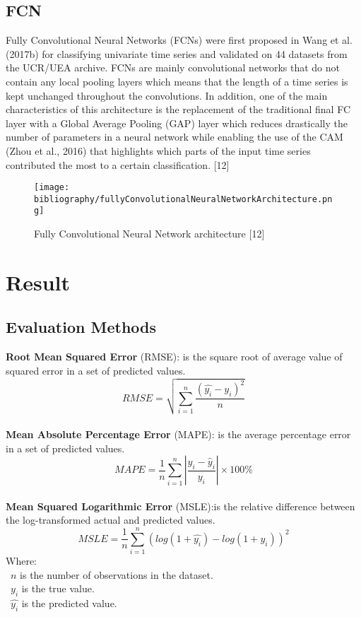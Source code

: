\documentclass{ieeeojies}
\begin{document}
\subsection{FCN}
Fully Convolutional Neural Networks (FCNs) were first proposed in Wang et al. (2017b) for classifying univariate time series and validated on 44 datasets from the UCR/UEA archive. FCNs are mainly convolutional networks that do not contain any local pooling layers which means that the length of a time series is kept unchanged throughout the convolutions. In addition, one of the main characteristics of this architecture is the replacement of the traditional final FC layer with a Global Average Pooling (GAP) layer which reduces drastically the number of parameters in a neural network while enabling the use of the CAM (Zhou et al., 2016) that highlights which parts of the input time series contributed the most to a certain classification.  [12]
\begin{figure}[H]
    \centering
    \begin{minipage}{1\linewidth}
        \centering
        \texttt{[image: bibliography/fullyConvolutionalNeuralNetworkArchitecture.png]}
        \caption{Fully Convolutional Neural Network architecture [12]}
        \label{fig11}
    \end{minipage}
\end{figure}

\section{Result}
\subsection{Evaluation Methods}
\textbf{Root Mean Squared Error} (RMSE): is the square root of average value of squared error in a set of predicted values.\\
\[RMSE=\sqrt{\sum_{i=1}^{n} \frac{(\hat{y_i}-y_i )^2}{n} }\]\\
\textbf{Mean Absolute Percentage Error} (MAPE): is the average percentage error in a set of predicted values.\\
\[MAPE = \frac{1}{n} \sum_{i=1}^{n} \left| \frac{y_i - \hat{y}_i}{y_i} \right| \times 100\%\]\\
\textbf{Mean Squared Logarithmic Error} (MSLE):is the relative difference between the log-transformed actual and predicted values.\\
\[MSLE=\frac{1}{n}\sum_{i=1}^{n}(log(1+\hat{y_i})-log(1+y_i))^2\]
Where: \\
	\indent\textbullet\ \(n\) is the number of observations in the dataset.\\
	\indent\textbullet\ \(y_i\)  is the true value.\\
	\indent\textbullet\ \(\hat{y_i}\) is the predicted value.
\end{document}
